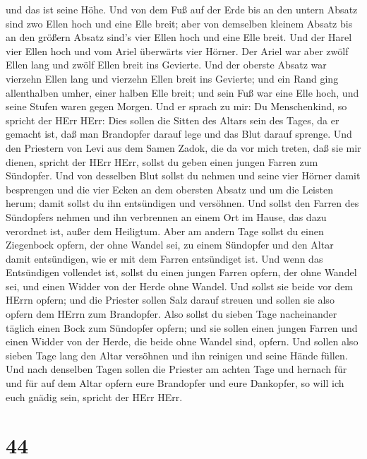 und das ist seine Höhe.  Und von dem Fuß auf der Erde bis
an den untern Absatz sind zwo Ellen hoch und eine Elle breit; aber von
demselben kleinem Absatz bis an den größern Absatz sind's vier Ellen
hoch und eine Elle breit.  Und der Harel vier Ellen hoch
und vom Ariel überwärts vier Hörner.  Der Ariel war aber
zwölf Ellen lang und zwölf Ellen breit ins Gevierte.  Und
der oberste Absatz war vierzehn Ellen lang und vierzehn Ellen breit ins
Gevierte; und ein Rand ging allenthalben umher, einer halben Elle breit;
und sein Fuß war eine Elle hoch, und seine Stufen waren gegen Morgen.
 Und er sprach zu mir: Du Menschenkind, so spricht der HErr
HErr: Dies sollen die Sitten des Altars sein des Tages, da er gemacht
ist, daß man Brandopfer darauf lege und das Blut darauf sprenge.
 Und den Priestern von Levi aus dem Samen Zadok, die da vor
mich treten, daß sie mir dienen, spricht der HErr HErr, sollst du geben
einen jungen Farren zum Sündopfer.  Und von desselben Blut
sollst du nehmen und seine vier Hörner damit besprengen und die vier
Ecken an dem obersten Absatz und um die Leisten herum; damit sollst du
ihn entsündigen und versöhnen.  Und sollst den Farren des
Sündopfers nehmen und ihn verbrennen an einem Ort im Hause, das dazu
verordnet ist, außer dem Heiligtum.  Aber am andern Tage
sollst du einen Ziegenbock opfern, der ohne Wandel sei, zu einem
Sündopfer und den Altar damit entsündigen, wie er mit dem Farren
entsündiget ist.  Und wenn das Entsündigen vollendet ist,
sollst du einen jungen Farren opfern, der ohne Wandel sei, und einen
Widder von der Herde ohne Wandel.  Und sollst sie beide vor
dem HErrn opfern; und die Priester sollen Salz darauf streuen und sollen
sie also opfern dem HErrn zum Brandopfer.  Also sollst du
sieben Tage nacheinander täglich einen Bock zum Sündopfer opfern; und
sie sollen einen jungen Farren und einen Widder von der Herde, die beide
ohne Wandel sind, opfern.  Und sollen also sieben Tage lang
den Altar versöhnen und ihn reinigen und seine Hände füllen.
 Und nach denselben Tagen sollen die Priester am achten
Tage und hernach für und für auf dem Altar opfern eure Brandopfer und
eure Dankopfer, so will ich euch gnädig sein, spricht der HErr HErr.

\hypertarget{section-43}{%
\section{44}\label{section-43}}

